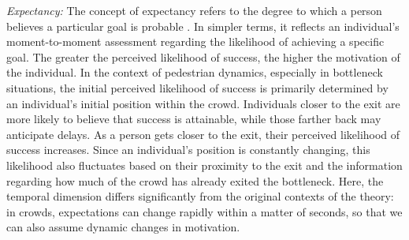 \documentclass[pdflatex,sn-mathphys-num]{sn-jnl}%
\theoremstyle{thmstyleone}%
\theoremstyle{thmstyletwo}%
\theoremstyle{thmstylethree}%
\begin{document}
\textit{Expectancy:} The concept of expectancy refers to the degree to which a person believes a particular goal is probable \cite{vroom_work_1964}. In simpler terms, it reflects an individual’s moment-to-moment assessment regarding the likelihood of achieving a specific goal. The greater the perceived likelihood of success, the higher the motivation of the individual. In the context of pedestrian dynamics, especially in bottleneck situations, the initial perceived likelihood of success is primarily determined by an individual’s initial position within the crowd. Individuals closer to the exit are more likely to believe that success is attainable, while those farther back may anticipate delays. As a person gets closer to the exit, their perceived likelihood of success increases. Since an individual’s position is constantly changing, this likelihood also fluctuates based on their proximity to the exit and the information regarding how much of the crowd has already exited the bottleneck. Here, the temporal dimension differs significantly from the original contexts of the theory: in crowds, expectations can change rapidly within a matter of seconds, so that we can also assume dynamic changes in motivation. 
\end{document}
